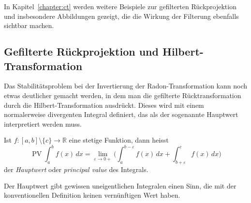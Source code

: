In Kapitel~\ref{chapter:ct} werden weitere Beispiele zur gefilterten
Rückprojektion und insbesondere Abbildungen gezeigt, die die Wirkung
der Filterung ebenfalls sichtbar machen.

%
%
\subsection{Gefilterte Rückprojektion und Hilbert-Transformation}
Das Stabilitätsproblem bei der Invertierung der Radon-Transformation
kann noch etwas deutlicher gemacht werden, in dem man die gefilterte
Rücktransformation durch die Hilbert-Transformation ausdrückt.
Dieses wird mit einem normalerweise divergenten Integral definiert,
das als der sogenannte Hauptwert interpretiert werden muss.

\begin{definition}
Ist $f\colon[a,b]\setminus\{c\}\to\mathbb{R}$ eine stetige Funktion,
dann heisst
\[
\operatorname{PV}
\int_a^b f(x)\,dx
=
\lim_{\varepsilon\to 0+}
\biggl(
\int_a^{b-\varepsilon} f(x)\,dx
+
\int_{b+\varepsilon}^c f(x)\,dx
\biggr)
\]
der {\em Hauptwert} oder {\em principal value} des Integrals.
\end{definition}

Der Hauptwert gibt gewissen uneigentlichen Integralen einen Sinn, 
die mit der konventionellen Definition keinen vernünftigen Wert haben.

